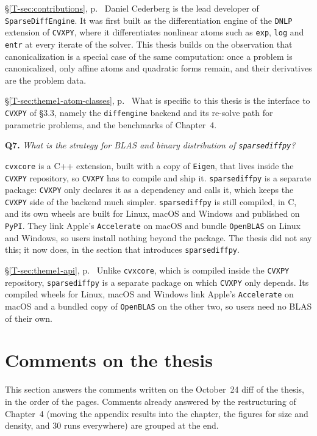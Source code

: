\documentclass[letterpaper,12pt]{article}
\newcommand{\ac}[1]{#1}
\newcommand{\tsec}[1]{\S\ref{T-#1}}
\newcommand{\tpage}[1]{p.~\pageref{T-#1}}
\newcommand{\tref}[1]{\tsec{#1}, \tpage{#1}}
\newcommand{\question}[2]{\FloatBarrier\par\bigskip\textbf{Q#1.} \emph{#2}\par}
\begin{document}
\begin{thesisquote}{\tref{sec:contributions}}
Daniel Cederberg is the lead developer of \texttt{SparseDiffEngine}. It was first built as the differentiation engine of the
\texttt{DNLP} extension of \texttt{CVXPY}, where it differentiates nonlinear atoms such as
\texttt{exp}, \texttt{log} and \texttt{entr} at every iterate of the solver. This thesis builds
on the observation that canonicalization is a special case of the same computation: once a
problem is canonicalized, only affine atoms and quadratic forms remain, and their derivatives
are the problem data.
\end{thesisquote}
\begin{thesisquote}{\tref{sec:theme1-atom-classes}}
What is specific to this thesis is the interface to \texttt{CVXPY} of \S3.3, namely the
\texttt{diffengine} backend and its re-solve path for parametric problems, and the benchmarks of
Chapter~4.
\end{thesisquote}

\question{7}{What is the strategy for \ac{BLAS} and binary distribution of
\texttt{sparsediffpy}?}
\texttt{cvxcore} is a C++ extension, built with a copy of \texttt{Eigen}, that lives inside the
\texttt{CVXPY} repository, so \texttt{CVXPY} has to compile and ship it.
\texttt{sparsediffpy} is a separate package: \texttt{CVXPY} only declares it as a dependency and
calls it, which keeps the \texttt{CVXPY} side of the backend much simpler. \texttt{sparsediffpy}
is still compiled, in C, and its own wheels are built for Linux, macOS and Windows and published
on \texttt{PyPI}. They link Apple's \texttt{Accelerate} on macOS and bundle \texttt{OpenBLAS} on
Linux and Windows, so users install nothing beyond the package. The thesis did not say this; it
now does, in the section that introduces \texttt{sparsediffpy}.

\begin{thesisquote}{\tref{sec:theme1-api}}
Unlike \texttt{cvxcore}, which is compiled inside the \texttt{CVXPY} repository,
\texttt{sparsediffpy} is a separate package on which \texttt{CVXPY} only depends. Its compiled
wheels for Linux, macOS and Windows link Apple's \texttt{Accelerate} on macOS and a bundled copy
of \texttt{OpenBLAS} on the other two, so users need no \ac{BLAS} of their own.
\end{thesisquote}

\section{Comments on the thesis}\label{sec:thesis-comments}
This section answers the comments written on the October~24 diff of the thesis, in the order of
the pages. Comments already answered by the restructuring of Chapter~4 (moving the appendix
results into the chapter, the figures for size and density, and $30$ runs everywhere) are
grouped at the end.
\end{document}
